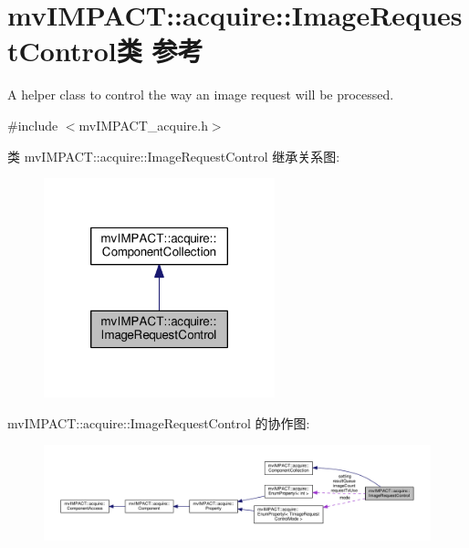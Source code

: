 \hypertarget{classmv_i_m_p_a_c_t_1_1acquire_1_1_image_request_control}{\section{mv\+I\+M\+P\+A\+C\+T\+:\+:acquire\+:\+:Image\+Request\+Control类 参考}
\label{classmv_i_m_p_a_c_t_1_1acquire_1_1_image_request_control}
}


A helper class to control the way an image request will be processed.  




{\ttfamily \#include $<$mv\+I\+M\+P\+A\+C\+T\+\_\+acquire.\+h$>$}



类 mv\+I\+M\+P\+A\+C\+T\+:\+:acquire\+:\+:Image\+Request\+Control 继承关系图\+:
\nopagebreak
\begin{figure}[H]
\begin{center}
\leavevmode
\includegraphics[width=190pt]{classmv_i_m_p_a_c_t_1_1acquire_1_1_image_request_control__inherit__graph}
\end{center}
\end{figure}


mv\+I\+M\+P\+A\+C\+T\+:\+:acquire\+:\+:Image\+Request\+Control 的协作图\+:
\nopagebreak
\begin{figure}[H]
\begin{center}
\leavevmode
\includegraphics[width=350pt]{classmv_i_m_p_a_c_t_1_1acquire_1_1_image_request_control__coll__graph}
\end{center}
\end{figure}
